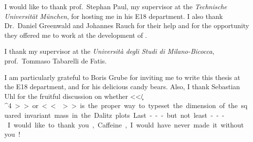 \begin{acknowledgements}

    I would like to thank prof.~Stephan Paul, my supervisor at the \textsl{Technische Universit\"at M\"unchen}, for hosting me in his {\small E18} department.
    I also thank Dr.~Daniel Greenwald and Johannes Rauch for their help and for the opportunity they offered me to work at the development of .


    I thank my supervisor at the \textsl{Università degli Studi di Milano-Bicocca}, prof.~Tommaso Tabarelli de Fatis.


    I am particularly grateful to Boris Grube for inviting me to write this thesis at the {\small E18} department, and for his delicious candy bears.
    Also, I thank Sebastian Uhl for the fruitful discussion on whether <<\si{\square{\giga\electronvolt}/\c^4}>> or <<\si{\square{(\giga\electronvolt/\square{\c})}}>> is the proper way to typeset the dimension of the squared invariant mass in the Dalitz plots.

    Last---but not least---I would like to thank you, Caffeine, I would have never made it without you!

    \begin{figure}[h]
        \centering
        
    \end{figure}

\end{acknowledgements}
